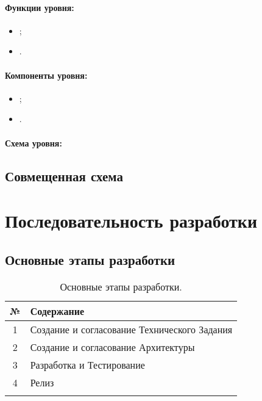 \documentclass[12pt,a4paper,fullpage,titlepage]{article}
\begin{document}
\paragraph{Функции уровня:}
\begin{itemize}
	\item ;
	\item .\\
\end{itemize}

\paragraph{Компоненты уровня:}
\begin{itemize}
	\item ;
	\item .\\
\end{itemize}

\paragraph{Схема уровня:}

\newpage
\subsection{Совмещенная схема}

\newpage
\section{Последовательность разработки}
\subsection{Основные этапы разработки}
\begin{table}[h]
\begin{tabularx}{\textwidth}{|c|X|}
	\hline
	 № & Содержание\\
	\hline
	1 & Создание и согласование Технического Задания\\
	\hline
	2 & Создание и согласование Архитектуры\\
	\hline
	3 & Разработка и Тестирование\\
	\hline
	4 & Релиз\\
	\hline
	 & \\
	\hline
\end{tabularx}
\caption{Основные этапы разработки.}
\end{table}
\end{document}
